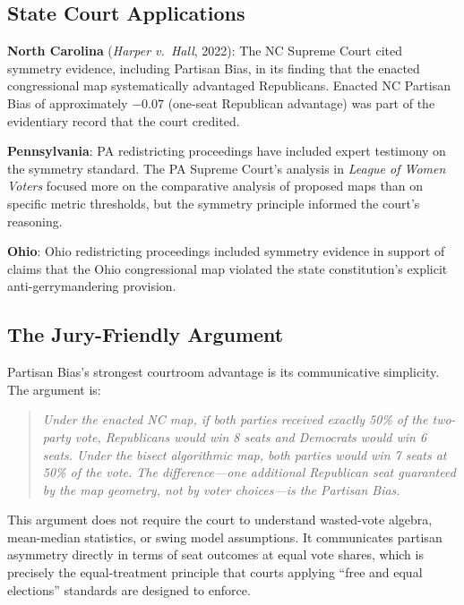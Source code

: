 \subsection{State Court Applications}

\textbf{North Carolina} (\textit{Harper v.\ Hall}, 2022): The NC Supreme Court
cited symmetry evidence, including Partisan Bias, in its finding that the enacted
congressional map systematically advantaged Republicans. Enacted NC Partisan Bias
of approximately $-0.07$ (one-seat Republican advantage) was part of the evidentiary
record that the court credited.

\textbf{Pennsylvania}: PA redistricting proceedings have included expert testimony
on the symmetry standard. The PA Supreme Court's analysis in \textit{League of
Women Voters} focused more on the comparative analysis of proposed maps than on
specific metric thresholds, but the symmetry principle informed the court's reasoning.

\textbf{Ohio}: Ohio redistricting proceedings included symmetry evidence in support
of claims that the Ohio congressional map violated the state constitution's explicit
anti-gerrymandering provision.

\subsection{The Jury-Friendly Argument}

Partisan Bias's strongest courtroom advantage is its communicative simplicity.
The argument is:
\begin{quote}
\textit{Under the enacted NC map, if both parties received exactly 50\% of
the two-party vote, Republicans would win 8 seats and Democrats would win 6 seats.
Under the bisect algorithmic map, both parties would win 7 seats at 50\% of the vote.
The difference---one additional Republican seat guaranteed by the map geometry, not
by voter choices---is the Partisan Bias.}
\end{quote}
This argument does not require the court to understand wasted-vote algebra, mean-median
statistics, or swing model assumptions. It communicates partisan asymmetry directly in
terms of seat outcomes at equal vote shares, which is precisely the equal-treatment
principle that courts applying ``free and equal elections'' standards are designed to enforce.
